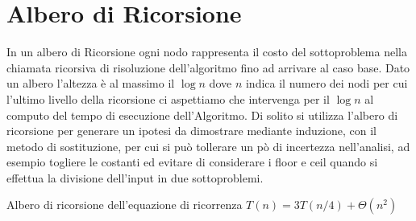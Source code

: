 \section{Albero di Ricorsione}
In un albero di Ricorsione ogni nodo rappresenta il costo del sottoproblema nella
chiamata ricorsiva di risoluzione dell'algoritmo fino ad arrivare al caso base.
Dato un albero l'altezza è  al massimo il $\log n$ dove $n$ indica il numero dei nodi
per cui l'ultimo livello della ricorsione ci aspettiamo che intervenga per il $\log n$
al computo del tempo di esecuzione dell'Algoritmo.
Di solito si utilizza l'albero di ricorsione per generare un ipotesi da dimostrare
mediante induzione, con il metodo di sostituzione, per cui si può tollerare un pò
di incertezza nell'analisi, ad esempio togliere le costanti ed evitare di considerare
i floor e ceil quando si effettua la divisione dell'input in due sottoproblemi.

Albero di ricorsione dell'equazione di ricorrenza $T(n) = 3T(n/4) + \Theta(n^2)$

